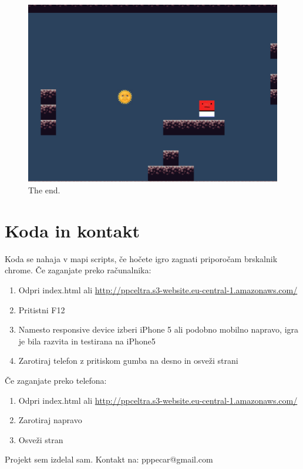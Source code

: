\documentclass[a4paper,11pt]{article}
\begin{document}
\begin{figure}[htbp]
	\begin{center}
		\includegraphics[scale=0.4]{thegame.png}
		\caption{The end.}
		\label{game_scr}
	\end{center}
\end{figure}
\pagebreak

\section{Koda in kontakt}

Koda se nahaja v mapi scripts, če hočete igro zagnati priporočam brskalnik chrome. Če zaganjate preko računalnika:
\begin{enumerate}
	\item Odpri index.html ali \url{http://ppceltra.s3-website.eu-central-1.amazonaws.com/}
	\item Pritistni F12
	\item Namesto responsive device izberi iPhone 5 ali podobno mobilno napravo, igra je bila razvita in testirana na iPhone5
	\item Zarotiraj telefon z pritiskom gumba na desno in osveži strani
\end{enumerate}

Če zaganjate preko telefona:
\begin{enumerate}
	\item Odpri index.html ali \url{http://ppceltra.s3-website.eu-central-1.amazonaws.com/}
	\item Zarotiraj napravo
	\item Osveži stran
\end{enumerate}

Projekt sem izdelal sam. Kontakt na: pppecar@gmail.com
\end{document}
